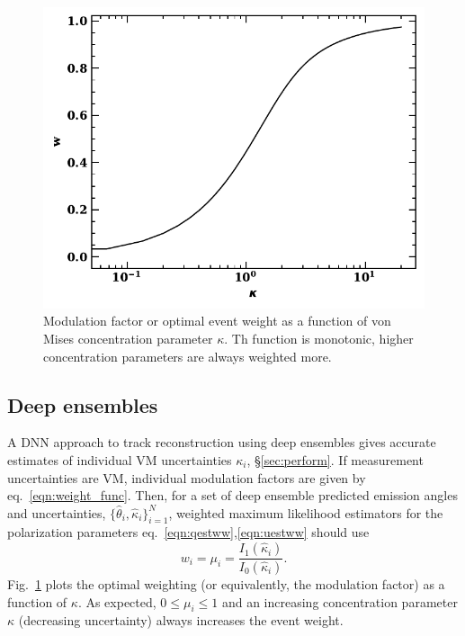 \begin{figure}[t]
\centering
\includegraphics[scale=.8]{figures/weight.pdf}
\caption{Modulation factor or optimal event weight as a function of von Mises concentration parameter $\kappa$. Th function is monotonic, higher concentration parameters are always weighted more. }
\label{fig:weight}       %
\end{figure}

\subsection{Deep ensembles}
A DNN approach to track reconstruction using deep ensembles gives accurate estimates of individual VM uncertainties $\kappa_i$, \S\ref{sec:perform}. If measurement uncertainties are VM, individual modulation factors are given by eq.~\ref{eqn:weight_func}. 
Then, for a set of deep ensemble predicted emission angles and uncertainties, $\{\hat{\theta}_i, \hat{\kappa}_i\}^N_{i=1}$, weighted maximum likelihood estimators for the polarization parameters eq.~\ref{eqn:qestww},\ref{eqn:uestww} should use
\begin{equation}
\label{eqn:modw}
    w_i = \mu_i = \frac{I_1(\hat{\kappa}_i)}{I_0(\hat{\kappa}_i)}.
\end{equation}
Fig.~\ref{fig:weight} plots the optimal weighting (or equivalently, the modulation factor) as a function of $\kappa$. As expected, $0 \leq \mu_i \leq 1$ and an increasing concentration parameter $\kappa$ (decreasing uncertainty) always increases the event weight.

